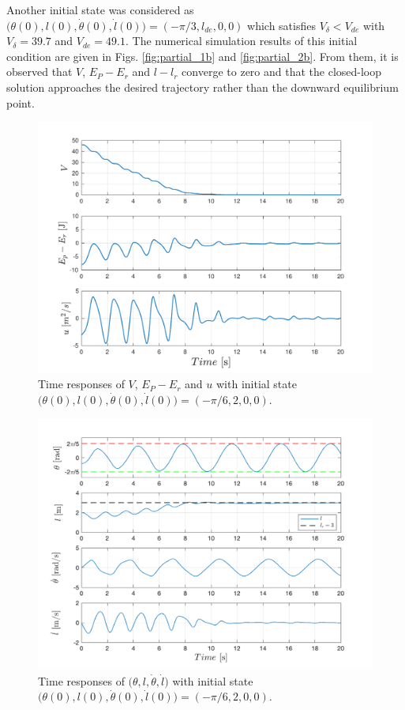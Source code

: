 \documentclass[main.tex]{subfiles}
\begin{document}
Another initial state was considered as $\big(\theta(0),l(0),\dot{\theta}(0),\dot{l}(0)\big) = (-\pi/3,l_{de},0,0)$ which satisfies $V_{\delta}<V_{de}$ with $V_{\delta} = 39.7$ and $V_{de} = 49.1$. The numerical simulation results of this initial condition are given in Figs. \ref{fig:partial_1b} and \ref{fig:partial_2b}. From them, it is observed that $V$, $E_P-E_r$ and $l-l_r$ converge to zero and that the closed-loop solution approaches the desired trajectory rather than the downward equilibrium point.
\begin{figure}[H]
    \centering
    \includegraphics[scale = 0.6]{figures/Partial_Energy_Shaping/partial_1.pdf}
    \caption{Time responses of $V$, $E_P-E_r$ and $u$ with initial state  $\big(\theta(0), l(0), \dot{\theta}(0), \dot{l}(0)\big) = (-\pi/6, 2, 0, 0)$.}
    \label{fig:partial_1}
\end{figure}
\begin{figure}[H]
    \centering
    \includegraphics[scale = 0.6]{figures/Partial_Energy_Shaping/partial_2.pdf}
    \caption{Time responses of $\big(\theta,l,\dot{\theta},\dot{l}\big)$ with initial state $\big(\theta(0),l(0),\dot{\theta}(0),\dot{l}(0)\big) = (-\pi/6,2,0,0)$.}
    \label{fig:partial_2}
\end{figure}
\end{document}
